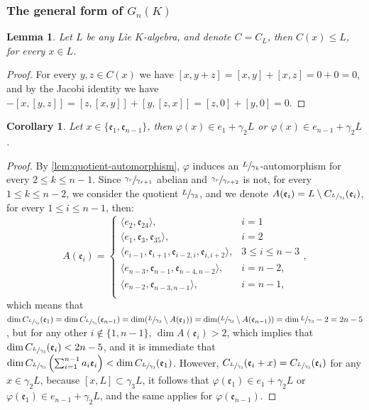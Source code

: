 \documentclass{article}
\newtheorem{lemma4}[paragraph]{Lemma}
\newtheorem{corollary4}[paragraph]{Corollary}
\newcommand{\e}{\mathfrak{e}}
\begin{document}
\subsubsection{The general form of $G_n(K)$}
\begin{lemma4}
\label{lem:centralizer_subgroup}
Let $L$ be any Lie $K$-algebra, and denote $C=C_L$, then $C(x)\leq{L}$, for every $x\in{L}$.
\end{lemma4}
\begin{proof}
For every $y,z\in{C}(x)$ we have 
$[x,y+z]=[x,y]+[x,z]=0+0=0$, and by the Jacobi identity we have $-[x,[y,z]]=[z,[x,y]]+[y,[z,x]]=[z,0]+[y,0]=0$.
\end{proof}
\begin{corollary4}
Let $x\in\{\e_1,\e_{n-1}\}$, then $\varphi(x)\in{e}_1+\gamma_2{L}$ or $\varphi(x)\in{e}_{n-1}+\gamma_2{L}$.
\end{corollary4}
\begin{proof}
By \ref{lem:quotient-automorphism}, $\varphi$ induces an $\sfrac{{L}}{\gamma_k}$-automorphism for every $2\leq{k}\leq{n-1}$. Since $\sfrac{\gamma_r}{\gamma_{r+1}}$ abelian and $\sfrac{\gamma_r}{\gamma_{r+2}}$ is not, for every $1\leq{k}\leq{n-2}$, we consider the quotient $\sfrac{{L}}{\gamma_3}$, and we denote $A(\e_i)={L}\setminus{C}_{\sfrac{{L}}{\gamma_3}}(\e_i)$, for every $1\leq{i}\leq{n}-1$, then:
\[A(\e_i)=
\begin{cases}
\langle{e}_2,\e_{24}\rangle,&i=1\\
\langle{e}_1,\e_3,\e_{35}\rangle,&i=2\\
\langle{e}_{i-1},\e_{i+1},\e_{i-2,i},\e_{i,i+2}\rangle,&3\leq{i}\leq{n}-3\\
\langle{e}_{n-3},\e_{n-1},\e_{n-4,n-2}\rangle,&i=n-2,\\
\langle{e}_{n-2},\e_{n-3,n-1}\rangle,&i=n-1,\\
\end{cases},
\]
which means that $\dim{C}_{\sfrac{{L}}{\gamma_3}}(\e_1)=\dim{C}_{\sfrac{{L}}{\gamma_3}}(\e_{n-1})=\dim(\sfrac{{L}}{\gamma_3}\setminus{A}(\e_1))=\dim(\sfrac{{L}}{\gamma_3}\setminus{A}(\e_{n-1}))=\dim\sfrac{{L}}{\gamma_3}-2=2n-5$, but for any other $i\notin\{1,n-1\}$, $\dim{A}(\e_i)>2$, which implies that $\dim{C}_{\sfrac{{L}}{\gamma_3}}(\e_i)<2n-5$, and it is immediate that $\dim{C}_{\sfrac{{L}}{\gamma_3}}\left(\sum_{i=1}^{n-1}a_i\e_i\right)<\dim{C}_{\sfrac{{L}}{\gamma_3}}(\e_1)$.
However, $C_{\sfrac{{L}}{\gamma_3}}(\e_i+x)=C_{\sfrac{{L}}{\gamma_3}}(\e_i)$ for any $x\in\gamma_2{L}$, because $[x,{L}]\subset\gamma_3{L}$, it follows that $\varphi(\e_1)\in{e}_1+\gamma_2{L}$ or $\varphi(\e_1)\in{e}_{n-1}+\gamma_2{L}$, and the same applies for $\varphi(\e_{n-1})$.
\end{proof}
\end{document}
